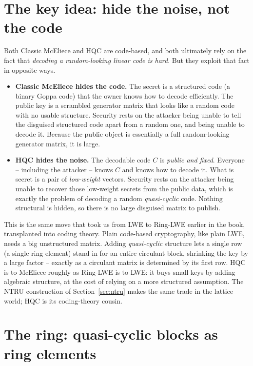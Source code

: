 \section{The key idea: hide the noise, not the code}

Both Classic McEliece and HQC are code-based, and both ultimately rely on the fact that \emph{decoding a random-looking linear code is hard}. But they exploit that fact in opposite ways.

\begin{itemize}
  \item \textbf{Classic McEliece hides the code.} The secret is a structured code (a binary Goppa code) that the owner knows how to decode efficiently. The public key is a scrambled generator matrix that looks like a random code with no usable structure. Security rests on the attacker being unable to tell the disguised structured code apart from a random one, and being unable to decode it. Because the public object is essentially a full random-looking generator matrix, it is large.
  \item \textbf{HQC hides the noise.} The decodable code $C$ is \emph{public and fixed}. Everyone -- including the attacker -- knows $C$ and knows how to decode it. What is secret is a pair of \emph{low-weight} vectors. Security rests on the attacker being unable to recover those low-weight secrets from the public data, which is exactly the problem of decoding a random \emph{quasi-cyclic} code. Nothing structural is hidden, so there is no large disguised matrix to publish.
\end{itemize}

This is the same move that took us from LWE to Ring-LWE earlier in the book, transplanted into coding theory. Plain code-based cryptography, like plain LWE, needs a big unstructured matrix. Adding \emph{quasi-cyclic} structure lets a single row (a single ring element) stand in for an entire circulant block, shrinking the key by a large factor -- exactly as a circulant matrix is determined by its first row. HQC is to McEliece roughly as Ring-LWE is to LWE: it buys small keys by adding algebraic structure, at the cost of relying on a more structured assumption. The NTRU construction of Section~\ref{sec:ntru} makes the same trade in the lattice world; HQC is its coding-theory cousin.

\section{The ring: quasi-cyclic blocks as ring elements}

